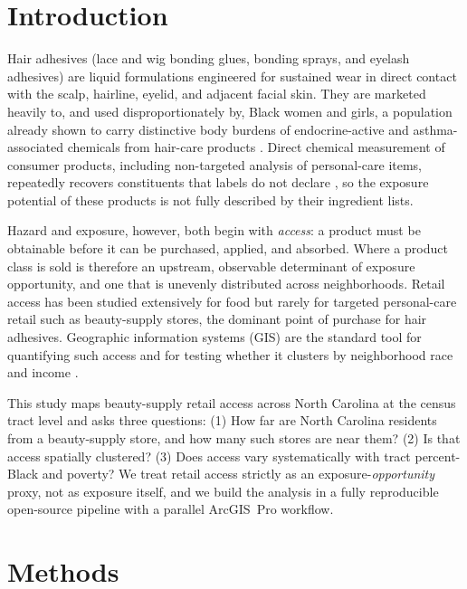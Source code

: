 \documentclass[12pt,letterpaper]{article}
\begin{document}
\section{Introduction}
\label{sec:intro}

Hair adhesives (lace and wig bonding glues, bonding sprays, and eyelash
adhesives) are liquid formulations engineered for sustained wear in direct
contact with the scalp, hairline, eyelid, and adjacent facial skin. They are
marketed heavily to, and used disproportionately by, Black women and
girls, a population already shown to carry distinctive body burdens of
endocrine-active and asthma-associated chemicals from hair-care products
\citep{helm2018,jamestodd2021,zota2017}. Direct chemical measurement of
consumer products, including non-targeted analysis of personal-care items,
repeatedly recovers constituents that labels do not declare
\citep{dodson2012,boatman2026}, so the exposure potential of these products is
not fully described by their ingredient lists.

Hazard and exposure, however, both begin with \emph{access}: a product must be
obtainable before it can be purchased, applied, and absorbed. Where a product
class is sold is therefore an upstream, observable determinant of exposure
opportunity, and one that is unevenly distributed across neighborhoods. Retail
access has been studied extensively for food \citep{walker2010} but rarely for
targeted personal-care retail such as beauty-supply stores, the dominant point
of purchase for hair adhesives. Geographic information systems (GIS) are the
standard tool for quantifying such access and for testing whether it clusters
by neighborhood race and income \citep{anselin1995,moran1950}.

This study maps beauty-supply retail access across North Carolina at the census
tract level and asks three questions: (1) How far are North Carolina residents
from a beauty-supply store, and how many such stores are near them? (2) Is that
access spatially clustered? (3) Does access vary systematically with tract
percent-Black and poverty? We treat retail access strictly as an
exposure-\emph{opportunity} proxy, not as exposure itself, and we build the
analysis in a fully reproducible open-source pipeline with a parallel ArcGIS~Pro
workflow.

\section{Methods}
\label{sec:methods}
\end{document}
